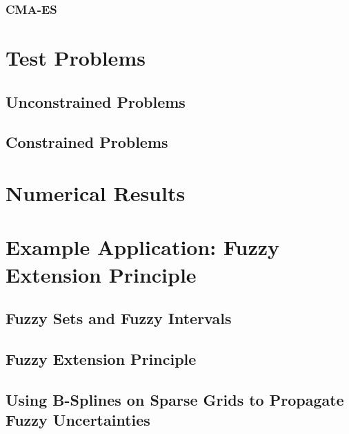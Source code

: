
\subsubsection{CMA-ES}


\section{Test Problems}


\subsection{Unconstrained Problems}


\subsection{Constrained Problems}


\section{Numerical Results}


\section{Example Application: Fuzzy Extension Principle}


\subsection{Fuzzy Sets and Fuzzy Intervals}


\subsection{Fuzzy Extension Principle}


\subsection{Using B-Splines on Sparse Grids to Propagate Fuzzy Uncertainties}


